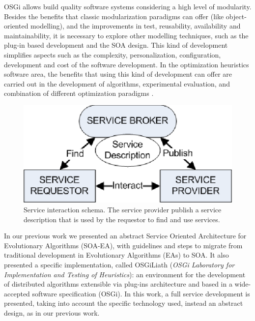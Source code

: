 \documentclass{sig-alternate}
\begin{document}
OSGi allows build quality software systems considering a high level of modularity. Besides the benefits that classic
modularization paradigms can offer (like object-oriented modelling),
and the improvements in test, reusability, availability and
maintainability, it is necessary to explore other modelling techniques, such as the
plug-in based development and the SOA design. This kind of development
simplifies aspects such as the complexity, personalization, configuration,
development and cost of the software development. In the optimization
heuristics software area, the benefits that using this kind of
development can offer are carried out in the development of algorithms,
experimental evaluation, and combination of different optimization
paradigms \cite{PLUGINS}.  





\begin{figure}[ht] 
\begin{center} 
\includegraphics[scale=1]{images/soaDiagram.eps}
\end{center} 
\caption{Service interaction schema. The service provider publish a service description that is used by the requestor to find and use services.} 
\label{SOADIAGRAM} 
\end{figure} 







In our previous work \cite{OSGILIATH} we presented an abstract Service Oriented Architecture for Evolutionary Algorithms (SOA-EA), with guidelines and steps to migrate from traditional development in Evolutionary Algorithms (EAs) to SOA. It also presented a specific implementation, called OSGiLiath ({\em OSGi Laboratory for Implementation and Testing of Heuristics}): an environment for the development of distributed algorithms extensible via plug-ins architecture and based in a wide-accepted software specification (OSGi). In this work, a full service development is presented, taking into account the specific technology used, instead an abstract design, as in our previous work.
\end{document}
